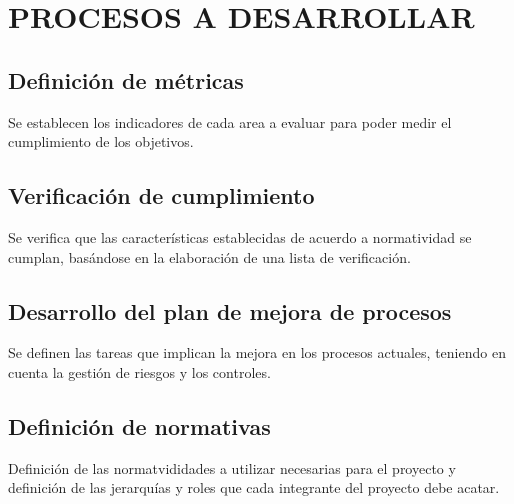 \chapter{PROCESOS A DESARROLLAR}
%
\section{Definici\'on de m\'etricas}
Se establecen los indicadores de cada area a evaluar para poder medir el cumplimiento de los objetivos.
%
\section{Verificaci\'on de cumplimiento}
Se verifica que las caracter\'isticas establecidas de acuerdo a normatividad se cumplan, bas\'andose en
la elaboraci\'on de una lista de verificaci\'on.
%
\section{Desarrollo del plan de mejora de procesos}
Se definen las tareas que implican la mejora en los procesos actuales, teniendo en cuenta la gesti\'on de
riesgos y los controles.
%
\section{Definici\'on de normativas}
Definici\'on de las normatvididades a utilizar necesarias para el proyecto y definici\'on de las jerarqu\'ias
y roles que cada integrante del proyecto debe acatar.